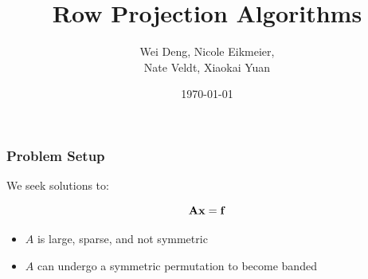 \documentclass{beamer}
\title[]{Row Projection Algorithms} %
\author{Wei Deng,  Nicole Eikmeier, \\ Nate Veldt,  Xiaokai Yuan} %
\institute[UCLA] %
{
Purdue University \\ %
\medskip
}
\date{\today} %
\begin{document}
\begin{frame}
\titlepage %
\end{frame}








\frame
{
  \frametitle{Problem Setup}
We seek solutions to:

\[ \bf{ Ax = f} \]

\begin{itemize}
\item $A$ is large, sparse, and not symmetric
\item $A$ can undergo a symmetric permutation to become banded
\end{itemize}

}
\end{document}
